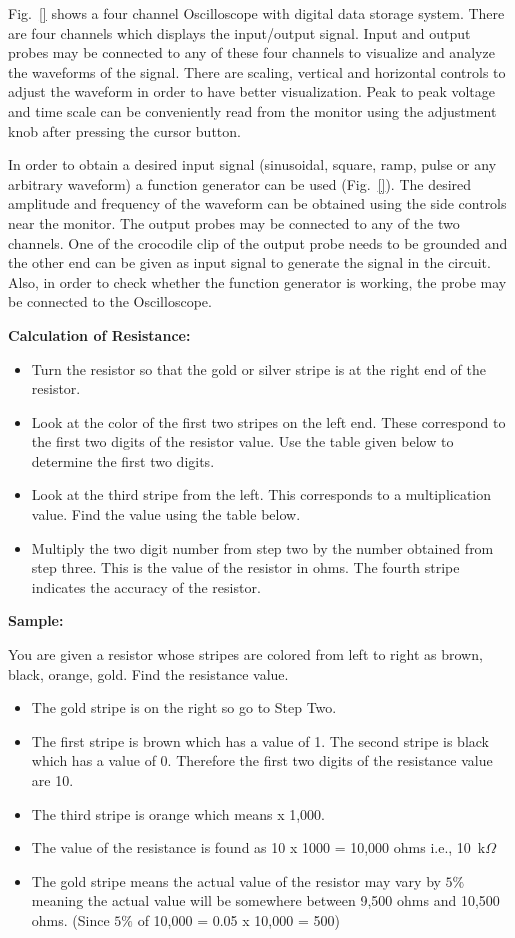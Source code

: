 \documentclass[9pt]{scrreprt}
\begin{document}
Fig.~\ref{} shows a four channel Oscilloscope with digital data storage system. There are four
channels which displays the input/output signal. Input and output probes may be connected to any of these
four channels to visualize and analyze the waveforms of the signal. There are scaling, vertical and
horizontal controls to adjust the waveform in order to have better visualization. Peak to peak voltage and
time scale can be conveniently read from the monitor using the adjustment knob after pressing the cursor
button.

In order to obtain a desired input signal (sinusoidal, square, ramp, pulse or any arbitrary
waveform) a function generator can be used (Fig.~\ref{}). The desired amplitude and frequency of the
waveform can be obtained using the side controls near the monitor. The output probes may be connected
to any of the two channels. One of the crocodile clip of the output probe needs to be grounded and the
other end can be given as input signal to generate the signal in the circuit. Also, in order to check whether
the function generator is working, the probe may be connected to the Oscilloscope.

\textbf{Calculation of Resistance:}
\begin{itemize}
\item Turn the resistor so that the gold or silver stripe is at the right end of the resistor.
\item Look at the color of the first two stripes on the left end. These correspond to the first two digits
of the resistor value. Use the table given below to determine the first two digits.
\item Look at the third stripe from the left. This corresponds to a multiplication value. Find the value
using the table below.
\item Multiply the two digit number from step two by the number obtained from step three. This is the
value of the resistor in ohms. The fourth stripe indicates the accuracy of the resistor.
\end{itemize}

\textbf{Sample:}


You are given a resistor whose stripes are colored from left to right as brown, black, orange, gold. Find
the resistance value.
\begin{itemize}
\item The gold stripe is on the right so go to Step Two.
\item The first stripe is brown which has a value of 1. The second stripe is black which has a value of 0.
Therefore the first two digits of the resistance value are 10.
\item The third stripe is orange which means x 1,000.
\item The value of the resistance is found as 10 x 1000 = 10,000 ohms i.e., 10~k$\Omega$ 
\item The gold stripe means the actual value of the resistor may vary by $5\%$ meaning the actual value
will be somewhere between 9,500 ohms and 10,500 ohms. (Since $5\%$ of 10,000 = 0.05 x 10,000 = 500)
\end{itemize}
\end{document}

